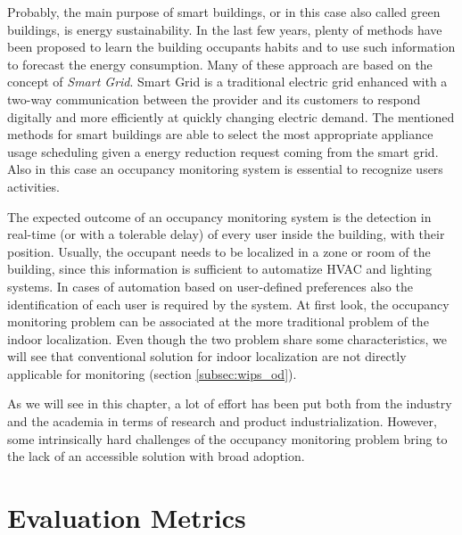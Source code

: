\smallskip
Probably, the main purpose of smart buildings, or in this case also called green buildings, is energy sustainability.
In the last few years, plenty of methods have been proposed to learn the building occupants habits and to use such information to forecast the energy consumption.
Many of these approach are based on the concept of \emph{Smart Grid}. Smart Grid is a traditional electric grid enhanced with a two-way communication between the provider and its customers to respond digitally and more efficiently at quickly changing electric demand.
The mentioned methods for smart buildings are able to select the most appropriate appliance usage scheduling given a energy reduction request coming from the smart grid. Also in this case an occupancy monitoring system is essential to recognize users activities.

\medskip
The expected outcome of an occupancy monitoring system is the detection in real-time (or with a tolerable delay) of every user inside the building, with their position. Usually, the occupant needs to be localized in a zone or room of the building, since this information is sufficient to automatize HVAC and lighting systems. In cases of automation based on user-defined preferences also the identification of each user is required by the system.
At first look, the occupancy monitoring problem can be associated at the more traditional problem of the indoor localization. Even though the two problem share some characteristics, we will see that conventional solution for indoor localization are not directly applicable for monitoring (section \ref{subsec:wips_od}).

\smallskip
As we will see in this chapter, a lot of effort has been put both from the industry and the academia in terms of research and product industrialization. However, some intrinsically hard challenges of the occupancy monitoring problem bring to the lack of an accessible solution with broad adoption.


\section{Evaluation Metrics}
\label{sec:occupancy-metrics}

